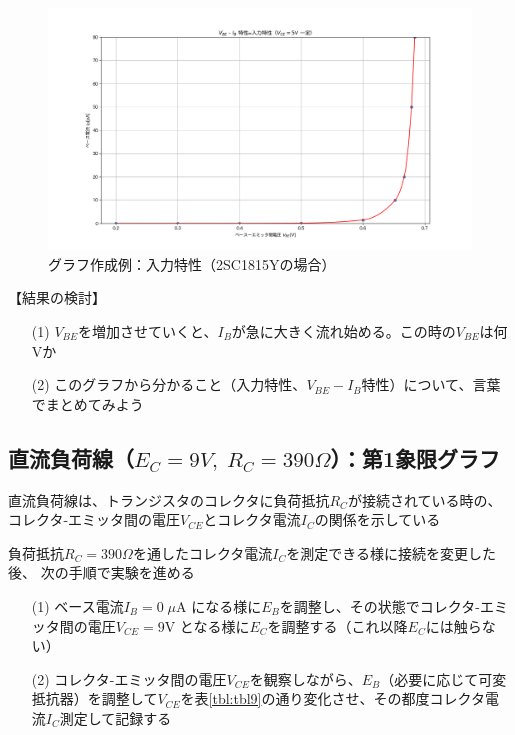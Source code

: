 \documentclass[uplatex,a4paper,11pt,oneside,openany]{jsbook}
\begin{document}
\begin{figure}[H]
  \centering
   \includegraphics[keepaspectratio, scale=0.45, angle=0]
               {figs/png/x3static.png}
               \caption{グラフ作成例：入力特性（2SC1815Yの場合）}
               \label{fig:iocharM1Yd}
\end{figure}

【結果の検討】

\begin{enumerate}
	\item[(1)] $V_{BE}$を増加させていくと、$I_B$が急に大きく流れ始める。この時の$V_{BE}$は何Vか\\
	\item[(2)] このグラフから分かること（入力特性、$V_{BE}-I_B$特性）について、言葉でまとめてみよう
\end{enumerate}

\newpage

\subsection{直流負荷線（$E_C=9V,\;R_C=390\Omega$）：第1象限グラフ}

直流負荷線は、トランジスタのコレクタに負荷抵抗$R_C$が接続されている時の、
コレクタ-エミッタ間の電圧$V_{CE}$とコレクタ電流$I_C$の関係を示している


負荷抵抗$R_C=390\Omega$を通したコレクタ電流$I_C$を測定できる様に接続を変更した後、
次の手順で実験を進める

\begin{enumerate}
\item[(1)] ベース電流$I_B=0\;\mu$A になる様に$E_B$を調整し、その状態でコレクタ-エミッタ間の電圧$V_{CE}=9$V となる様に$E_C$を調整する（これ以降$E_C$には触らない）
\item[(2)] コレクタ-エミッタ間の電圧$V_{CE}$を観察しながら、$E_B$（必要に応じて可変抵抗器）を調整して$V_{CE}$を表\ref{tbl:tbl9}の通り変化させ、その都度コレクタ電流$I_C$測定して記録する  
\end{enumerate}
\end{document}
